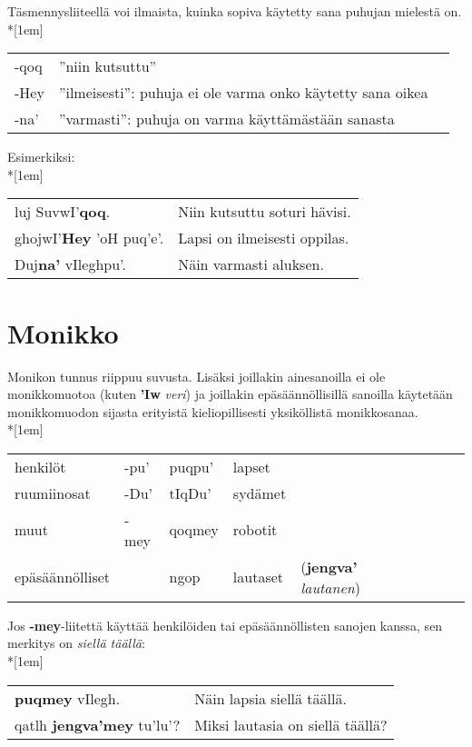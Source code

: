 \documentclass{book}
\begin{document}
Täsmennysliiteellä voi ilmaista, kuinka sopiva käytetty sana puhujan mielestä on.\\*[1em]
\begin{tabular}{Bl l}
    -qoq & ''niin kutsuttu'' \\
    -Hey & ''ilmeisesti'': puhuja ei ole varma onko käytetty sana oikea \\
    -na' & ''varmasti'': puhuja on varma käyttämästään sanasta \\
\end{tabular}

Esimerkiksi:\\*[1em]
\begin{tabular}{l l}
    luj SuvwI'\textbf{qoq}. & Niin kutsuttu soturi hävisi. \\
    ghojwI'\textbf{Hey} 'oH puq'e'. & Lapsi on ilmeisesti oppilas. \\
    Duj\textbf{na'} vIleghpu'. & Näin varmasti aluksen. \\
\end{tabular}

\section{Monikko}

Monikon tunnus riippuu suvusta.
Lisäksi joillakin ainesanoilla ei ole monikkomuotoa (kuten \textbf{'Iw} \textit{veri})
ja joillakin epäsäännöllisillä sanoilla käytetään monikkomuodon sijasta erityistä kieliopillisesti yksiköllistä monikkosanaa.\\*[1em]
\begin{tabular}{l Bl | Bl Il l}
henkilöt & -pu' & puqpu' & lapset & \\
ruumiinosat & -Du' & tIqDu' & sydämet & \\
muut & -mey & qoqmey & robotit & \\
epäsäännölliset & & ngop & lautaset & (\textbf{jengva'} \textit{lautanen}) \\
\end{tabular}

Jos \textbf{-mey}-liitettä käyttää henkilöiden tai epäsäännöllisten sanojen kanssa, sen merkitys on \textit{siellä täällä}:\\*[1em]
\begin{tabular}{l l}
    \textbf{puqmey} vIlegh. & Näin lapsia siellä täällä. \\
    qatlh \textbf{jengva'mey} tu'lu'? & Miksi lautasia on siellä täällä? \\
\end{tabular}
\end{document}
